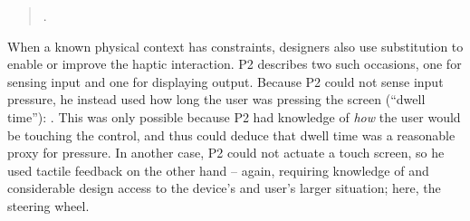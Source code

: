 \begin{quote}
.
\end{quote}

When a known physical context has constraints, designers also use substitution to  enable or improve the haptic interaction.
P2 describes two such occasions, one for sensing input and one for displaying output.
Because P2 could not sense input pressure, he instead used %
how long the user was pressing the screen (``dwell time''): %
.
This was only possible because P2 had knowledge of \emph{how} the user would be touching the control, and thus could deduce that dwell time was a reasonable proxy for pressure.
In another case, P2 could not actuate a touch screen, so he used tactile feedback on the other hand -- again, requiring knowledge of and considerable design access to the device's and user's larger situation; here, the steering wheel.



